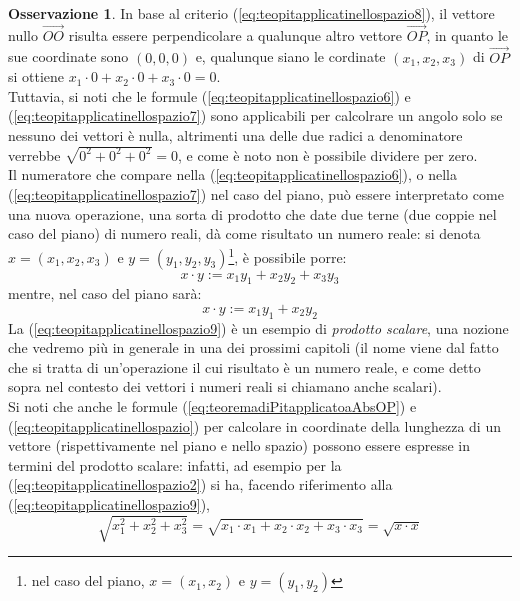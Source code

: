 \documentclass{book}
\theoremstyle{definition}
\newtheorem{oss}{Osservazione}[section]
\theoremstyle{plain}
\begin{document}
\begin{oss}
  \label{oss:teopitapplicatinellospazio2}
  In base al criterio (\ref{eq:teopitapplicatinellospazio8}), il vettore nullo $\vec{OO}$ risulta essere perpendicolare a qualunque altro vettore $\vec{OP}$, in quanto le sue coordinate sono $(0,0,0)$ e, qualunque siano le cordinate $(x_1,x_2,x_3)$ di $\vec{OP}$ si ottiene $x_1\cdot0+x_2\cdot 0+ x_3\cdot 0=0$.\\
  Tuttavia, si noti che le formule (\ref{eq:teopitapplicatinellospazio6}) e (\ref{eq:teopitapplicatinellospazio7}) sono applicabili per calcolrare un angolo solo se nessuno dei vettori è nulla, altrimenti una delle due radici a denominatore verrebbe $\sqrt{0^2+0^2+0^2}=0$, e come è noto non è possibile dividere per zero.\\
  Il numeratore che compare nella (\ref{eq:teopitapplicatinellospazio6}), o nella (\ref{eq:teopitapplicatinellospazio7}) nel caso del piano, può essere interpretato come una nuova operazione, una sorta di prodotto che date due terne (due coppie nel caso del piano) di numero reali, dà come risultato un numero reale: si denota $x=(x_1,x_2,x_3)$ e $y=(y_1,y_2,y_3)$\footnote{nel caso del piano, $x=(x_1,x_2)$ e $y=(y_1,y_2)$}, è possibile porre:
  \begin{equation}
    \label{eq:teopitapplicatinellospazio9}
    x\cdot y:=x_1y_1+x_2y_2+x_3y_3
  \end{equation}
  mentre, nel caso del piano sarà:
  \begin{equation*}
    x\cdot y:=x_1y_1+x_2y_2
  \end{equation*}
  La (\ref{eq:teopitapplicatinellospazio9}) è un esempio di \textit{prodotto scalare}, una nozione che vedremo più in generale in una dei prossimi capitoli (il nome viene dal fatto che si tratta di un'operazione il cui risultato è un numero reale, e come detto sopra nel contesto dei vettori i numeri reali si chiamano anche scalari).\\
  Si noti che anche le formule (\ref{eq:teoremadiPitapplicatoaAbsOP}) e (\ref{eq:teopitapplicatinellospazio}) per calcolare in coordinate della lunghezza di un vettore (rispettivamente nel piano e nello spazio) possono essere espresse in termini del prodotto scalare: infatti, ad esempio per la (\ref{eq:teopitapplicatinellospazio2}) si ha, facendo riferimento alla (\ref{eq:teopitapplicatinellospazio9}),
  \begin{equation*}
    \sqrt{x_1^2+x_2^2+x_3^2}=\sqrt{x_1\cdot x_1+x_2\cdot x_2+x_3\cdot x_3}=\sqrt{x\cdot x}
  \end{equation*}
\end{oss}
\end{document}
